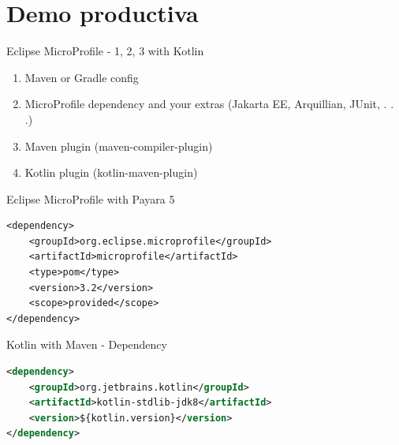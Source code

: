 \documentclass[aspectratio=169]{beamer}
\begin{document}
{
    \section{Demo productiva}
}


\begin{frame}{Eclipse MicroProfile - 1, 2, 3 with Kotlin}
\begin{enumerate}
	\item Maven or Gradle config
	\item MicroProfile dependency and your extras (Jakarta EE, Arquillian, JUnit, . . .)
	\item Maven plugin (maven-compiler-plugin)
	\item Kotlin plugin (kotlin-maven-plugin)
\end{enumerate}
\end{frame}

\begin{frame}[fragile]{Eclipse MicroProfile with Payara 5}
\begin{lstlisting}
<dependency>
    <groupId>org.eclipse.microprofile</groupId>
    <artifactId>microprofile</artifactId>
    <type>pom</type>
    <version>3.2</version>
    <scope>provided</scope>
</dependency>
\end{lstlisting}
\end{frame}


\begin{frame}[fragile]{Kotlin with Maven - Dependency}
\begin{lstlisting}[language=XML]
<dependency>
    <groupId>org.jetbrains.kotlin</groupId>
    <artifactId>kotlin-stdlib-jdk8</artifactId>
    <version>${kotlin.version}</version>
</dependency>
\end{lstlisting}
\end{frame}
\end{document}
